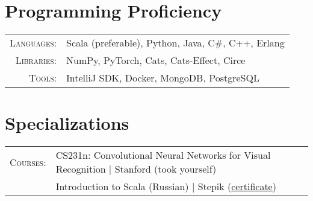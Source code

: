 \documentclass[a4paper,11pt]{article}
\begin{document}
\section{Programming Proficiency}
\begin{tabular}{rl}
  \textsc{Languages:}& Scala (preferable), Python, Java, C\#, C++, Erlang\\
  \textsc{Libraries:}& NumPy, PyTorch, Cats, Cats-Effect, Circe\\
  \textsc{Tools:}& IntelliJ SDK, Docker, MongoDB, PostgreSQL\\
\end{tabular}

\section{Specializations}
\begin{tabular}{rl}
  \textsc{Courses:}
  &CS231n: Convolutional Neural Networks for Visual Recognition | Stanford (took yourself)\\
  &Introduction to Scala (Russian) | Stepik (\href{https://stepik.org/cert/204169}{certificate})
\end{tabular}
\end{document}
